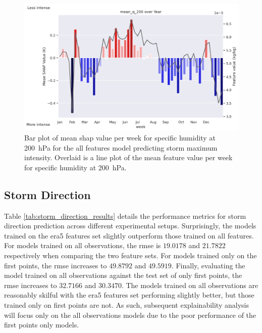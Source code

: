 \begin{figure}[ht]
    \centering
    \includegraphics[width=\textwidth]{../figures/generated/experiments/storm_max_intensity/temporal_corr/storm_max_intensity_all_shap_mean_q_200_by_week_over_year.png}
    \caption{Bar plot of mean \acrshort{shap} value per week for specific humidity at \SI{200}{\hecto\pascal} for the all features model predicting storm maximum intensity. Overlaid is a line plot of the mean feature value per week for specific humidity at \SI{200}{\hecto\pascal}.}
    \label{fig:storm_max_intensity_all_shap_mean_q_200_by_week_over_year}
\end{figure}

\clearpage
\subsection{Storm Direction}

Table \ref{tab:storm_direction_results} details the performance metrics for storm direction prediction across different experimental setups. Surprisingly, the models trained on the \acrshort{era5} features set slightly outperform those trained on all features. For models trained on all observations, the \acrshort{rmse} is $19.0178$ and $21.7822$ respectively when comparing the two feature sets. For models trained only on the first points, the \acrshort{rmse} increases to $49.8792$ and $49.5919$. Finally, evaluating the model trained on all observations against the test set of only first points, the \acrshort{rmse} increases to $32.7166$ and $30.3470$. The models trained on all observations are reasonably skilful with the \acrshort{era5} features set performing slightly better, but those trained only on first points are not. As such, subsequent explainability analysis will focus only on the all observations models due to the poor performance of the first points only models.

